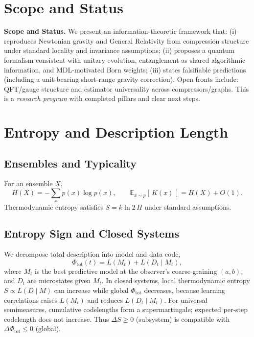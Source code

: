 \documentclass[aps,preprint,onecolumn,longbibliography,nofootinbib]{revtex4-2}
\numberwithin{equation}{section}        %
\begin{document}
\section{Scope and Status}
\textbf{Scope and Status.} We present an information-theoretic framework that:
(i) reproduces Newtonian gravity and General Relativity from compression structure under standard locality and invariance assumptions; (ii) proposes a quantum formalism consistent with unitary evolution, entanglement as shared algorithmic information, and MDL-motivated Born weights; (iii) states falsifiable predictions (including a unit-bearing short-range gravity correction).
Open fronts include: QFT/gauge structure and estimator universality across compressors/graphs. This is a \emph{research program} with completed pillars and clear next steps.

\section{Entropy and Description Length}

\subsection{Ensembles and Typicality}
For an ensemble $X$,
\begin{equation}
H(X) = -\sum_x p(x)\log p(x), \qquad
\mathbb{E}_{x\sim p}[\,K(x)\,] = H(X) + O(1). \label{eq:shannonK}
\end{equation}
Thermodynamic entropy satisfies $S = k\ln 2 \, H$ under standard assumptions.

\subsection{Entropy Sign and Closed Systems}\label{sec:closed}
We decompose total description into model and data code,
\begin{equation}
\Phi_{\text{tot}}(t) = L(M_t) + L(D_t \mid M_t),\label{eq:mdl-split}
\end{equation}
where $M_t$ is the best predictive model at the observer's coarse-graining $(a,b)$, and $D_t$ are microstates given $M_t$.
In closed systems, local thermodynamic entropy $S\propto L(D\mid M)$ can increase while global $\Phi_{\text{tot}}$ decreases, because learning correlations raises $L(M_t)$ and reduces $L(D_t\mid M_t)$. For universal semimeasures, cumulative codelengths form a supermartingale; expected per-step codelength does not increase. Thus $\Delta S\ge0$ (subsystem) is compatible with $\Delta \Phi_{\text{tot}}\le 0$ (global).
\end{document}
